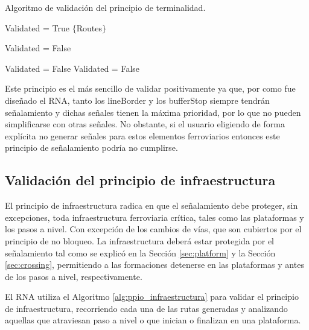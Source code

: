 		\begin{algorithm}[hbt!]
			\caption{Algoritmo de validación del principio de terminalidad.}\label{alg:ppio_terminalidad}
			\DontPrintSemicolon
			\SetNoFillComment
			\LinesNotNumbered 
			Validated = True\;
			$\{$Routes$\}$\; 
			{
				{
					{
						Validated = False\;
					}
				}
				
				{
					{
						Validated = False\;
					}
					{
						Validated = False\;
					}
				}
			}
			
		\end{algorithm}
		
		Este principio es el más sencillo de validar positivamente ya que, por como fue diseñado el RNA, tanto los lineBorder y los bufferStop siempre tendrán señalamiento y dichas señales tienen la máxima prioridad, por lo que no pueden simplificarse con otras señales. No obstante, si el usuario eligiendo de forma explícita no generar señales para estos elementos ferroviarios entonces este principio de señalamiento podría no cumplirse.		
				
	\subsection{Validación del principio de infraestructura}
		
		El principio de infraestructura radica en que el señalamiento debe proteger, sin excepciones, toda infraestructura ferroviaria crítica, tales como las plataformas y los pasos a nivel. Con excepción de los cambios de vías, que son cubiertos por el principio de no bloqueo. La infraestructura deberá estar protegida por el señalamiento tal como se explicó en la Sección \ref{sec:platform} y la Sección \ref{sec:crossing}, permitiendo a las formaciones detenerse en las plataformas y antes de los pasos a nivel, respectivamente.

		El RNA utiliza el Algoritmo \ref{alg:ppio_infraestructura} para validar el principio de infraestructura, recorriendo cada una de las rutas generadas y analizando aquellas que atraviesan paso a nivel o que inician o finalizan en una plataforma. 
		
